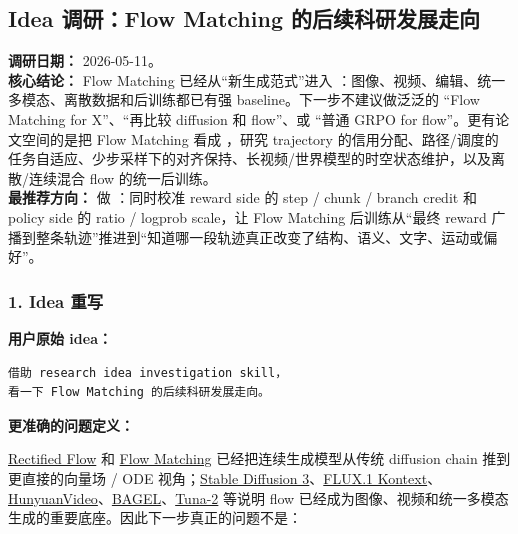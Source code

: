 \subsection*{Idea 调研：Flow Matching 的后续科研发展走向}
{}

\begin{conceptbox}
\textbf{调研日期：} 2026-05-11。\\
\textbf{核心结论：} Flow Matching 已经从“新生成范式”进入 ：图像、视频、编辑、统一多模态、离散数据和后训练都已有强 baseline。下一步不建议做泛泛的 ``Flow Matching for X''、``再比较 diffusion 和 flow''、或 ``普通 GRPO for flow''。更有论文空间的是把 Flow Matching 看成 ，研究 trajectory 的信用分配、路径/调度的任务自适应、少步采样下的对齐保持、长视频/世界模型的时空状态维护，以及离散/连续混合 flow 的统一后训练。\\
\textbf{最推荐方向：} 做 ：同时校准 reward side 的 step / chunk / branch credit 和 policy side 的 ratio / logprob scale，让 Flow Matching 后训练从“最终 reward 广播到整条轨迹”推进到“知道哪一段轨迹真正改变了结构、语义、文字、运动或偏好”。
\end{conceptbox}

\subsubsection*{1. Idea 重写}

\textbf{用户原始 idea：}

\begin{lstlisting}[language={},basicstyle=\ttfamily\small]
借助 research idea investigation skill，
看一下 Flow Matching 的后续科研发展走向。
\end{lstlisting}

\textbf{更准确的问题定义：}

\href{https://arxiv.org/abs/2209.03003}{Rectified Flow} 和 \href{https://arxiv.org/abs/2210.02747}{Flow Matching} 已经把连续生成模型从传统 diffusion chain 推到更直接的向量场 / ODE 视角；\href{https://arxiv.org/abs/2403.03206}{Stable Diffusion 3}、\href{https://arxiv.org/abs/2506.15742}{FLUX.1 Kontext}、\href{https://arxiv.org/abs/2412.03603}{HunyuanVideo}、\href{https://arxiv.org/abs/2505.14683}{BAGEL}、\href{https://arxiv.org/abs/2604.24763}{Tuna-2} 等说明 flow 已经成为图像、视频和统一多模态生成的重要底座。因此下一步真正的问题不是：

